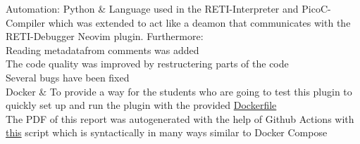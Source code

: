 \documentclass{report}
\begin{document}
\begin{table}[H]
\begin{tblr}
		Automation: Python     & {\hspace{\dimexpr\labelsep+0.5\tabcolsep}Language used in the RETI-Interpreter and PicoC-Compiler which was extended to act like a deamon that communicates with the RETI-Debugger Neovim plugin. Furthermore:                                                                            \\\hspace*{0.5\leftmargin}\hspace{\dimexpr\labelsep+0.5\tabcolsep}Reading metadatafrom comments was added\\\hspace*{0.5\leftmargin}\hspace{\dimexpr\labelsep+0.5\tabcolsep}The code quality was improved by restructering parts of the code\\\hspace*{0.5\leftmargin}\hspace{\dimexpr\labelsep+0.5\tabcolsep}Several bugs have been fixed}                                                                                                                                                                                                                \\
		Docker                 & {\hspace{\dimexpr\labelsep+0.5\tabcolsep} To provide a way for the students who are going to test this plugin to quickly set up and run the plugin with the provided \href{https://github.com/matthejue/RETI-Debugger/blob/main/Dockerfile}{Dockerfile}                                   \\\hspace{\dimexpr\labelsep+0.5\tabcolsep} The PDF of this report was autogenerated with the help of Github Actions with \href{https://github.com/matthejue/RETI-Debugger_Documentation/blob/master/.github/workflows/create_and_upload_pdf.yml}{this} script which is syntactically in many ways similar to Docker Compose}                                                                                                                                       \\

\end{tblr}
\end{table}
\end{document}
